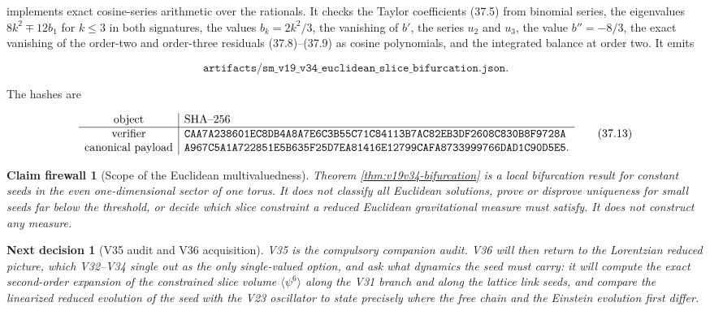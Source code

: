 \documentclass[11pt]{article}
\newtheorem{firewall}[theorem]{Claim firewall}
\newtheorem{decision}[theorem]{Next decision}
\theoremstyle{remark}
\begin{document}
implements exact cosine-series arithmetic over the rationals.  It checks
the Taylor coefficients (37.5) from binomial series, the eigenvalues
\(8k^2\mp12b_1\) for \(k\leq3\) in both signatures, the values
\(b_k=2k^2/3\), the vanishing of \(b'\), the series \(u_2\) and \(u_3\),
the value \(b''=-8/3\), the exact vanishing of the order-two and
order-three residuals (37.8)--(37.9) as cosine polynomials, and the
integrated balance at order two.  It emits

\[
 \texttt{artifacts/sm\_v19\_v34\_euclidean\_slice\_bifurcation.json}.
                                                                    \tag{37.12}
\]

The hashes are

\[
\begin{array}{c|l}
\hbox{object}&\hbox{SHA--256}\\ \hline
\hbox{verifier}&
\texttt{CAA7A238601EC8DB4A8A7E6C3B55C71C84113B7AC82EB3DF2608C830B8F9728A}\\
\hbox{canonical payload}&
\texttt{A967C5A1A722851E5B635F25D7EA81416E12799CAFA8733999766DAD1C90D5E5}.
\end{array}                                                     \tag{37.13}
\]

\begin{firewall}[Scope of the Euclidean multivaluedness]
\label{fire:v19v34}
Theorem \ref{thm:v19v34-bifurcation} is a local bifurcation result for
constant seeds in the even one-dimensional sector of one torus.  It does
not classify all Euclidean solutions, prove or disprove uniqueness for
small seeds far below the threshold, or decide which slice constraint a
reduced Euclidean gravitational measure must satisfy.  It does not
construct any measure.
\end{firewall}

\begin{decision}[V35 audit and V36 acquisition]
\label{dec:v19v34-next}
V35 is the compulsory companion audit.  V36 will then return to the
Lorentzian reduced picture, which V32--V34 single out as the only
single-valued option, and ask what dynamics the seed must carry: it will
compute the exact second-order expansion of the constrained slice volume
\(\langle\psi^6\rangle\) along the V31 branch and along the lattice
link seeds, and compare the linearized reduced evolution of the seed
with the V23 oscillator to state precisely where the free chain and the
Einstein evolution first differ.
\end{decision}
\end{document}
